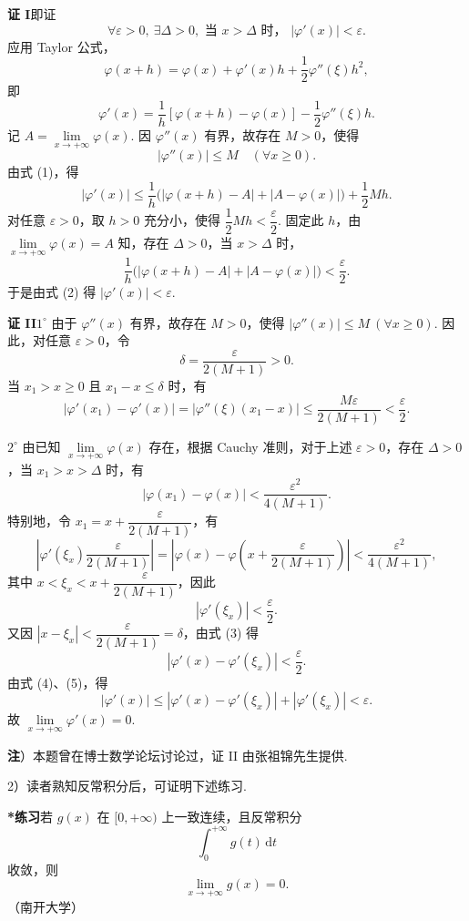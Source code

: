 \documentclass[UTF8,12pt,a4paper,fontset=fandol]{ctexart}
\begin{document}
\noindent\textbf{证 I}\quad 即证
\[
  \forall \varepsilon>0,\ \exists \Delta>0,\text{ 当 }x>\Delta\text{ 时， }|\varphi'(x)|<\varepsilon.
\]
应用 Taylor 公式，
\[
  \varphi(x+h)=\varphi(x)+\varphi'(x)h+\frac12\varphi''(\xi)h^2,
\]
即
\[
  \varphi'(x)=\frac1h[\varphi(x+h)-\varphi(x)]-\frac12\varphi''(\xi)h. \tag{1}
\]
记 $A=\lim\limits_{x\to+\infty}\varphi(x)$. 因 $\varphi''(x)$ 有界，故存在 $M>0$，使得
\[
  |\varphi''(x)|\le M\quad(\forall x\ge0).
\]
由式 (1)，得
\[
  |\varphi'(x)|\le\frac1h\bigl(|\varphi(x+h)-A|+|A-\varphi(x)|\bigr)+\frac12Mh. \tag{2}
\]
对任意 $\varepsilon>0$，取 $h>0$ 充分小，使得 $\dfrac12Mh<\dfrac{\varepsilon}{2}$. 固定此 $h$，由 $\lim\limits_{x\to+\infty}\varphi(x)=A$ 知，存在 $\Delta>0$，当 $x>\Delta$ 时，
\[
  \frac1h\bigl(|\varphi(x+h)-A|+|A-\varphi(x)|\bigr)<\frac{\varepsilon}{2}.
\]
于是由式 (2) 得 $|\varphi'(x)|<\varepsilon$.

\noindent\textbf{证 II}\quad $1^\circ$ 由于 $\varphi''(x)$ 有界，故存在 $M>0$，使得 $|\varphi''(x)|\le M\ (\forall x\ge0)$. 因此，对任意 $\varepsilon>0$，令
\[
  \delta=\frac{\varepsilon}{2(M+1)}>0.
\]
当 $x_1>x\ge0$ 且 $x_1-x\le\delta$ 时，有
\[
  |\varphi'(x_1)-\varphi'(x)|=|\varphi''(\xi)(x_1-x)|
  \le \frac{M\varepsilon}{2(M+1)}<\frac{\varepsilon}{2}. \tag{3}
\]

$2^\circ$ 由已知 $\lim\limits_{x\to+\infty}\varphi(x)$ 存在，根据 Cauchy 准则，对于上述 $\varepsilon>0$，存在 $\Delta>0$，当 $x_1>x>\Delta$ 时，有
\[
  |\varphi(x_1)-\varphi(x)|<\frac{\varepsilon^2}{4(M+1)}.
\]
特别地，令 $x_1=x+\dfrac{\varepsilon}{2(M+1)}$，有
\[
  \left|\varphi'(\xi_x)\frac{\varepsilon}{2(M+1)}\right|
  =\left|\varphi(x)-\varphi\left(x+\frac{\varepsilon}{2(M+1)}\right)\right|
  <\frac{\varepsilon^2}{4(M+1)},
\]
其中 $x<\xi_x<x+\dfrac{\varepsilon}{2(M+1)}$，因此
\[
  |\varphi'(\xi_x)|<\frac{\varepsilon}{2}. \tag{4}
\]
又因 $|x-\xi_x|<\dfrac{\varepsilon}{2(M+1)}=\delta$，由式 (3) 得
\[
  |\varphi'(x)-\varphi'(\xi_x)|<\frac{\varepsilon}{2}. \tag{5}
\]
由式 (4)、(5)，得
\[
  |\varphi'(x)|\le |\varphi'(x)-\varphi'(\xi_x)|+|\varphi'(\xi_x)|<\varepsilon.
\]
故 $\lim\limits_{x\to+\infty}\varphi'(x)=0$.

\noindent\textbf{注}）本题曾在博士数学论坛讨论过，证 II 由张祖锦先生提供.

2）读者熟知反常积分后，可证明下述练习.

\noindent\textbf{*练习}\quad 若 $g(x)$ 在 $[0,+\infty)$ 上一致连续，且反常积分
\[
  \int_0^{+\infty}g(t)\,\mathrm dt
\]
收敛，则
\[
  \lim_{x\to+\infty}g(x)=0.
\]
（南开大学）
\end{document}
